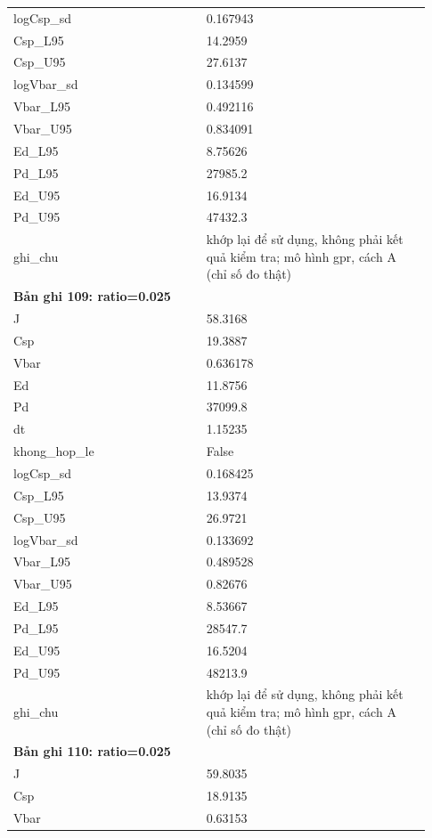 \begin{longtable}{p{0.43\linewidth}p{0.50\linewidth}}
logCsp\_\allowbreak sd & 0.167943 \\
Csp\_\allowbreak L95 & 14.2959 \\
Csp\_\allowbreak U95 & 27.6137 \\
logVbar\_\allowbreak sd & 0.134599 \\
Vbar\_\allowbreak L95 & 0.492116 \\
Vbar\_\allowbreak U95 & 0.834091 \\
Ed\_\allowbreak L95 & 8.75626 \\
Pd\_\allowbreak L95 & 27985.2 \\
Ed\_\allowbreak U95 & 16.9134 \\
Pd\_\allowbreak U95 & 47432.3 \\
ghi\_\allowbreak chu & khớp lại để sử dụng, không phải kết quả kiểm tra; mô hình gpr, cách A (chỉ số đo thật) \\
\midrule
\multicolumn{2}{p{0.95\linewidth}}{\textbf{Bản ghi 109: ratio=0.025}} \\
J & 58.3168 \\
Csp & 19.3887 \\
Vbar & 0.636178 \\
Ed & 11.8756 \\
Pd & 37099.8 \\
dt & 1.15235 \\
khong\_\allowbreak hop\_\allowbreak le & False \\
logCsp\_\allowbreak sd & 0.168425 \\
Csp\_\allowbreak L95 & 13.9374 \\
Csp\_\allowbreak U95 & 26.9721 \\
logVbar\_\allowbreak sd & 0.133692 \\
Vbar\_\allowbreak L95 & 0.489528 \\
Vbar\_\allowbreak U95 & 0.82676 \\
Ed\_\allowbreak L95 & 8.53667 \\
Pd\_\allowbreak L95 & 28547.7 \\
Ed\_\allowbreak U95 & 16.5204 \\
Pd\_\allowbreak U95 & 48213.9 \\
ghi\_\allowbreak chu & khớp lại để sử dụng, không phải kết quả kiểm tra; mô hình gpr, cách A (chỉ số đo thật) \\
\midrule
\multicolumn{2}{p{0.95\linewidth}}{\textbf{Bản ghi 110: ratio=0.025}} \\
J & 59.8035 \\
Csp & 18.9135 \\
Vbar & 0.63153 \\

\end{longtable}
